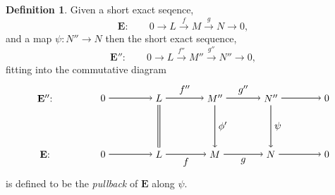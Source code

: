 \documentclass[11.5pt, twoside, a4paper, titlepage]{report}
\theoremstyle{definition}
\newtheorem{mydef}{Definition}[section]
\theoremstyle{plain}
\begin{document}
\begin{mydef} \label{pullbackdef}
Given a short exact seqence,
\begin{equation*}
\mathbf{E}: \qquad 0\xrightarrow{}L\xrightarrow{f} M \xrightarrow{g} N \xrightarrow{} 0,
\end{equation*}
and a map $\psi: N''\to N$ then the short exact sequence, 
\begin{equation*}
\mathbf{E''}: \qquad 0\xrightarrow{} L \xrightarrow{f''} M'' \xrightarrow{g''} N'' \xrightarrow{}0,
\end{equation*}
fitting into the commutative diagram
\begin{equation*}
\begin{tikzpicture}[->,-latex, auto, main path/.style={->, semithick}, main node/.style={}]
\node	[main node]		(1) at (0,0)		{$\mathbf{E''}$: \quad };
\node	[main node]		(2) at (2,0)		{$0$};
\node	[main node]		(3) at (4,0)		{$L$};
\node [main node]		(4) at (6,0)		{$M''$};
\node [main node]		(5) at (8,0)		{$N''$};
\node	[main node]		(11) at (10,0)	{$0$};

\node	[main node]		(6) at (0,-2)		{$\mathbf{E}$: \quad};
\node	[main node]		(7) at (2,-2)		{$0$};
\node	[main node]		(8) at (4,-2)		{$L$};
\node [main node]		(9) at (6,-2)		{$M$};
\node [main node]		(10) at (8,-2)	{$N$};
\node [main node]		(13) at (10,-2)	{$0$};

\draw (2) edge [main path] node [auto] {$$} (3);
\draw (3) edge [main path] node [auto] {$f''$} (4);
\draw (4) edge [main path] node [auto] {$g''$} (5);
\draw (5) edge [main path] (11);

\draw (7) edge [main path] node [auto] {$$} (8);
\draw (8) edge [main path] node [auto, swap] {$f$} (9);
\draw (9) edge [main path] node [auto, swap] {$g$} (10);
\draw (10) edge [main path] (13);

\draw (3) edge [-, semithick, double, double distance=1.5pt] (8);
\draw (4) edge [main path] node [auto] {$\phi'$} (9);
\draw (5) edge[main path] node [auto] {$\psi$} (10);
\end{tikzpicture}
\end{equation*}
is defined to be the \emph{pullback} of $\mathbf{E}$ along $\psi$.
\end{mydef}
\end{document}
